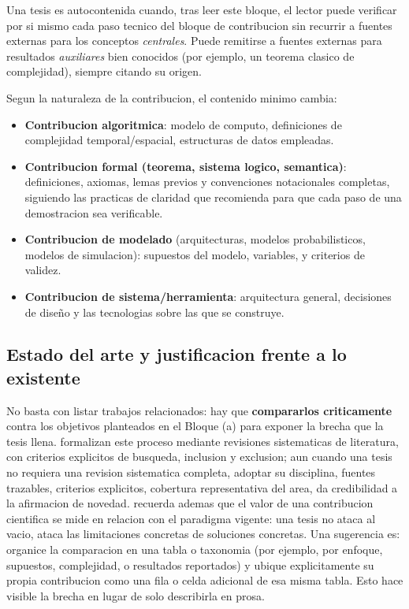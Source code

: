 \documentclass[11pt]{article}
\begin{document}
\begin{cajaDefinicion}
Una tesis es autocontenida cuando, tras leer este bloque, el lector puede
verificar por si mismo cada paso tecnico del bloque de contribucion sin
recurrir a fuentes externas para los conceptos \emph{centrales}. Puede
remitirse a fuentes externas para resultados \emph{auxiliares} bien
conocidos (por ejemplo, un teorema clasico de complejidad), siempre citando
su origen.
\end{cajaDefinicion}

Segun la naturaleza de la contribucion, el contenido minimo cambia:

\begin{itemize}
  \item \textbf{Contribucion algoritmica}: modelo de computo, definiciones de
  complejidad temporal/espacial, estructuras de datos empleadas.
  \item \textbf{Contribucion formal (teorema, sistema logico, semantica)}:
  definiciones, axiomas, lemas previos y convenciones notacionales completas,
  siguiendo las practicas de claridad que recomienda \citet{lamport1995write}
  para que cada paso de una demostracion sea verificable.
  \item \textbf{Contribucion de modelado} (arquitecturas, modelos
  probabilisticos, modelos de simulacion): supuestos del modelo, variables,
  y criterios de validez.
  \item \textbf{Contribucion de sistema/herramienta}: arquitectura general,
  decisiones de diseño y las tecnologias sobre las que se construye.
\end{itemize}

\subsection{Estado del arte y justificacion frente a lo existente}

No basta con listar trabajos relacionados: hay que \textbf{compararlos
criticamente} contra los objetivos planteados en el Bloque (a) para exponer
la brecha que la tesis llena. \citet{kitchenham2007guidelines} formalizan
este proceso mediante revisiones sistematicas de literatura, con criterios
explicitos de busqueda, inclusion y exclusion; aun cuando una tesis no
requiera una revision sistematica completa, adoptar su disciplina, fuentes
trazables, criterios explicitos, cobertura representativa del area, da
credibilidad a la afirmacion de novedad. \citet[cap.~2]{kuhn1962structure}
recuerda ademas que el valor de una contribucion cientifica se mide en
relacion con el paradigma vigente: una tesis no ataca al vacio, ataca las
limitaciones concretas de soluciones concretas. Una sugerencia es: 
organice la comparacion en una tabla o taxonomia (por ejemplo, por enfoque,
supuestos, complejidad, o resultados reportados) y ubique explicitamente su
propia contribucion como una fila o celda adicional de esa misma tabla. Esto
hace visible la brecha en lugar de solo describirla en prosa.
\end{document}
